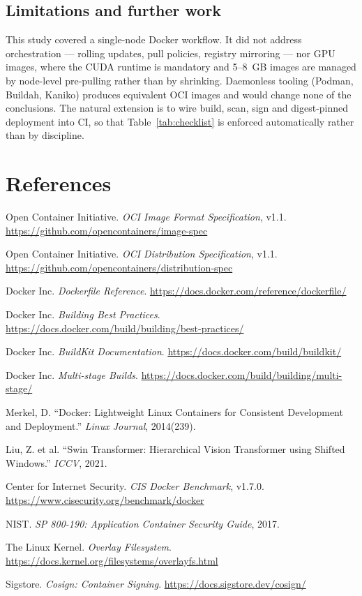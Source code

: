 \documentclass[10pt,a4paper]{article}
\begin{document}
\subsection{Limitations and further work}

This study covered a single-node Docker workflow. It did not address
orchestration --- rolling updates, pull policies, registry mirroring ---
nor GPU images, where the CUDA runtime is mandatory and 5--8~GB images are
managed by node-level pre-pulling rather than by shrinking. Daemonless
tooling (Podman, Buildah, Kaniko) produces equivalent OCI images and would
change none of the conclusions. The natural extension is to wire build,
scan, sign and digest-pinned deployment into CI, so that
Table~\ref{tab:checklist} is enforced automatically rather than by
discipline.

\section*{References}

\begin{enumerate}[leftmargin=2.2em,itemsep=3pt,label={[\arabic*]}]
  \item Open Container Initiative. \emph{OCI Image Format Specification},
        v1.1. \url{https://github.com/opencontainers/image-spec}
  \item Open Container Initiative. \emph{OCI Distribution Specification},
        v1.1. \url{https://github.com/opencontainers/distribution-spec}
  \item Docker Inc. \emph{Dockerfile Reference}.
        \url{https://docs.docker.com/reference/dockerfile/}
  \item Docker Inc. \emph{Building Best Practices}.
        \url{https://docs.docker.com/build/building/best-practices/}
  \item Docker Inc. \emph{BuildKit Documentation}.
        \url{https://docs.docker.com/build/buildkit/}
  \item Docker Inc. \emph{Multi-stage Builds}.
        \url{https://docs.docker.com/build/building/multi-stage/}
  \item Merkel, D. ``Docker: Lightweight Linux Containers for Consistent
        Development and Deployment.'' \emph{Linux Journal}, 2014(239).
  \item Liu, Z. et al. ``Swin Transformer: Hierarchical Vision
        Transformer using Shifted Windows.'' \emph{ICCV}, 2021.
  \item Center for Internet Security. \emph{CIS Docker Benchmark},
        v1.7.0. \url{https://www.cisecurity.org/benchmark/docker}
  \item NIST. \emph{SP 800-190: Application Container Security Guide}, 2017.
  \item The Linux Kernel. \emph{Overlay Filesystem}.
        \url{https://docs.kernel.org/filesystems/overlayfs.html}
  \item Sigstore. \emph{Cosign: Container Signing}.
        \url{https://docs.sigstore.dev/cosign/}
\end{enumerate}
\end{document}
